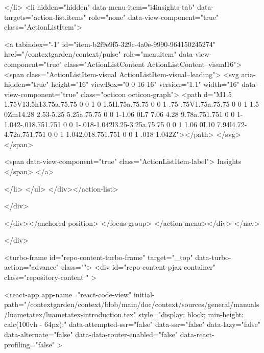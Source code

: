 </li>
        <li hidden="hidden" data-menu-item="i4insights-tab" data-targets="action-list.items" role="none" data-view-component="true" class="ActionListItem">
    
    
    <a tabindex="-1" id="item-b2f9e9f5-329c-4a0e-9990-964150245274" href="/contextgarden/context/pulse" role="menuitem" data-view-component="true" class="ActionListContent ActionListContent--visual16">
        <span class="ActionListItem-visual ActionListItem-visual--leading">
          <svg aria-hidden="true" height="16" viewBox="0 0 16 16" version="1.1" width="16" data-view-component="true" class="octicon octicon-graph">
    <path d="M1.5 1.75V13.5h13.75a.75.75 0 0 1 0 1.5H.75a.75.75 0 0 1-.75-.75V1.75a.75.75 0 0 1 1.5 0Zm14.28 2.53-5.25 5.25a.75.75 0 0 1-1.06 0L7 7.06 4.28 9.78a.751.751 0 0 1-1.042-.018.751.751 0 0 1-.018-1.042l3.25-3.25a.75.75 0 0 1 1.06 0L10 7.94l4.72-4.72a.751.751 0 0 1 1.042.018.751.751 0 0 1 .018 1.042Z"></path>
</svg>
        </span>
      
        <span data-view-component="true" class="ActionListItem-label">
          Insights
</span>      
</a>
  
</li>
</ul>    
</div></action-list>


</div>
      
</div></anchored-position>  </focus-group>
</action-menu></div>
</nav>

  </div>

  



<turbo-frame id="repo-content-turbo-frame" target="_top" data-turbo-action="advance" class="">
    <div id="repo-content-pjax-container" class="repository-content " >
    



    
      
    








<react-app
  app-name="react-code-view"
  initial-path="/contextgarden/context/blob/main/doc/context/sources/general/manuals/luametatex/luametatex-introduction.tex"
    style="display: block; min-height: calc(100vh - 64px);"
  data-attempted-ssr="false"
  data-ssr="false"
  data-lazy="false"
  data-alternate="false"
  data-data-router-enabled="false"
  data-react-profiling="false"
>
  

